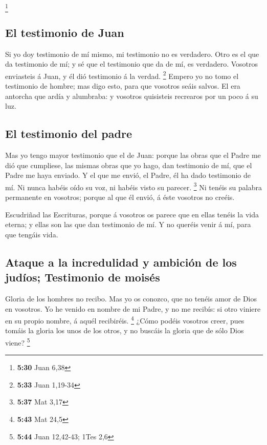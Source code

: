 \footnote{\textbf{5:30} Juan 6,38}

\hypertarget{el-testimonio-de-juan}{%
\subsection{El testimonio de Juan}\label{el-testimonio-de-juan}}

 Si yo doy testimonio de mí mismo, mi testimonio no es
verdadero.  Otro es el que da testimonio de mí; y sé que el
testimonio que da de mí, es verdadero.  Vosotros enviasteis
á Juan, y él dió testimonio á la verdad. \footnote{\textbf{5:33} Juan
  1,19-34}  Empero yo no tomo el testimonio de hombre; mas
digo esto, para que vosotros seáis salvos.  El era antorcha
que ardía y alumbraba: y vosotros quisisteis recrearos por un poco á su
luz.

\hypertarget{el-testimonio-del-padre}{%
\subsection{El testimonio del padre}\label{el-testimonio-del-padre}}

 Mas yo tengo mayor testimonio que el de Juan: porque las
obras que el Padre me dió que cumpliese, las mismas obras que yo hago,
dan testimonio de mí, que el Padre me haya enviado.  Y el
que me envió, el Padre, él ha dado testimonio de mí. Ni nunca habéis
oído su voz, ni habéis visto su parecer. \footnote{\textbf{5:37} Mat
  3,17}  Ni tenéis su palabra permanente en vosotros;
porque al que él envió, á éste vosotros no creéis.

 Escudriñad las Escrituras, porque á vosotros os parece que
en ellas tenéis la vida eterna; y ellas son las que dan testimonio de
mí.  Y no queréis venir á mí, para que tengáis vida.

\hypertarget{ataque-a-la-incredulidad-y-ambiciuxf3n-de-los-juduxedos-testimonio-de-moisuxe9s}{%
\subsection{Ataque a la incredulidad y ambición de los judíos;
Testimonio de
moisés}\label{ataque-a-la-incredulidad-y-ambiciuxf3n-de-los-juduxedos-testimonio-de-moisuxe9s}}

 Gloria de los hombres no recibo.  Mas yo os
conozco, que no tenéis amor de Dios en vosotros.  Yo he
venido en nombre de mi Padre, y no me recibís: si otro viniere en su
propio nombre, á aquél recibiréis. \footnote{\textbf{5:43} Mat 24,5}
 ¿Cómo podéis vosotros creer, pues tomáis la gloria los
unos de los otros, y no buscáis la gloria que de sólo Dios viene?
\footnote{\textbf{5:44} Juan 12,42-43; 1Tes 2,6}

